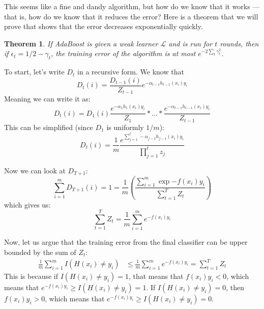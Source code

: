 \documentclass{article}
\newtheorem{thm}{Theorem}
\newcommand{\LL}{\ensuremath{\mathcal{L}}}
\begin{document}
This seems like a fine and dandy algorithm, but how do we know that it works
--- that is, how do we know that it reduces the error? Here is a theorem that
we will prove that shows that the error decreases exponentially quickly.

\begin{framed}
\begin{thm}
    If AdaBoost is given a weak learner $\LL$ and is run for $t$ rounds, then
    if $\epsilon_t = 1/2 - \gamma_t$, the training error of the algorithm is at
    most $e^{-2\sum_{t} \gamma_t^2}$.
\end{thm}
\end{framed}

To start, let's write $D_t$ in a recursive form. We know that
\begin{equation*}
    D_t(i) = \frac{D_{t-1}(i)}{Z_{t-1}}e^{-\alpha_{t-1} h_{t-1}(x_i) y_i}
\end{equation*}
Meaning we can write it as:
\begin{equation*}
    D_t(i) = D_1(i)\frac{e^{-\alpha_{1} h_{1}(x_i) y_i}}{Z_1}*\dots*
    \frac{e^{-\alpha_{t-1} h_{t-1}(x_i) y_i}}{Z_{t-1}}
\end{equation*}
This can be simplified (since $D_1$ is uniformly $1/m$):
\begin{equation*}
    D_t(i) = \frac{1}{m}\frac{e^{\sum_{j=1}^{t} -\alpha_{j-1} h_{j-1}(x_i)
    y_i}}{\prod_{j=1}^{t} z_j}
\end{equation*}

Now we can look at $D_{T+1}$:
\begin{equation*}
    \sum_{i=1}^{m}D_{T+1}(i) = 1 = \frac{1}{m}\left(\frac{\sum_{i=1}^{m}\exp{-f(x_i)y_i}}{\sum_{t=1}^{T}Z_t}\right)
\end{equation*}
which gives us:
\begin{equation*}
    \sum_{t=1}^{T}Z_t = \frac{1}{m}\sum_{i=1}^{m} e^{-f(x_i)y_i}
\end{equation*}

Now, let us argue that the training error from the final classifier can be
upper bounded by the sum of $Z_t$:
\begin{align*}
    \frac{1}{m}\sum_{i=1}^{m}I(H(x_i) \neq y_i) &\leq \frac{1}{m}\sum_{i=1}^{m} e^{-f(x_i)y_i} = \sum_{t=1}^{T}Z_t
\end{align*}
This is because if $I(H(x_i) \neq y_i) = 1$, that means that $f(x_i)y_i < 0$,
which means that $e^{-f(x_i)y_i} \geq I(H(x_i) \neq y_i) = 1$. If
$I(H(x_i) \neq y_i) = 0$, then $f(x_i)y_i > 0$,
which means that $e^{-f(x_i)y_i} \geq I(H(x_i) \neq y_i) = 0$.
\end{document}
